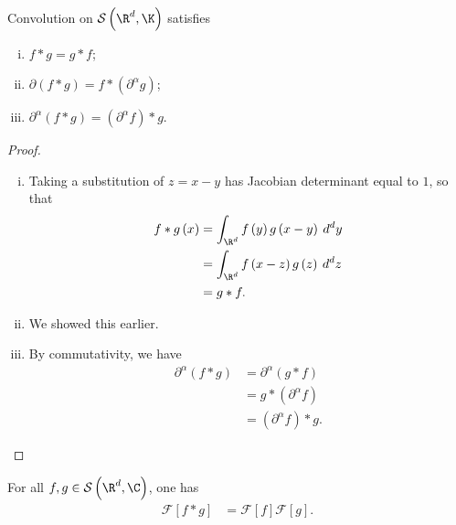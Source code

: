 \documentclass[10pt]{mypackage}
\begin{document}
\begin{proposition}
  Convolution on $\mathcal{S}\left( \R^d,\K \right)$ satisfies
  \begin{enumerate}[(i)]
    \item $f\ast g = g\ast f$;
    \item $\partial \left( f\ast g \right) = f\ast \left( \partial^{\alpha}g \right)$;
    \item $\partial^{\alpha}\left( f\ast g \right) = \left( \partial^{\alpha}f \right)\ast g$.
  \end{enumerate}
\end{proposition}
\begin{proof}\hfill
  \begin{enumerate}[(i)]
    \item Taking a substitution of $z = x-y$ has Jacobian determinant equal to $1$, so that
      \begin{align*}
        f\ast g\left( x \right) &= \int_{\R^d}^{} f\left( y \right)g\left( x-y \right)\:d^{d}y\\
                                &= \int_{\R^d}^{} f\left( x-z \right)g\left( z \right)\:d^{d}z\\
                                &= g\ast f.
      \end{align*}
    \item We showed this earlier.
    \item By commutativity, we have
      \begin{align*}
        \partial^{\alpha}\left( f\ast g \right) &= \partial^{\alpha}\left( g\ast f \right)\\
                                                &= g\ast \left( \partial^{\alpha}f \right)\\
                                                &= \left( \partial^{\alpha}f \right)\ast g.
      \end{align*}

  \end{enumerate}
\end{proof}
\begin{theorem}
  For all $f,g\in \mathcal{S}\left( \R^d,\C \right)$, one has
  \begin{align*}
    \mathcal{F}\left[ f\ast g \right] &= \mathcal{F}\left[ f \right]\mathcal{F}\left[ g \right].
  \end{align*}
\end{theorem}
\end{document}
